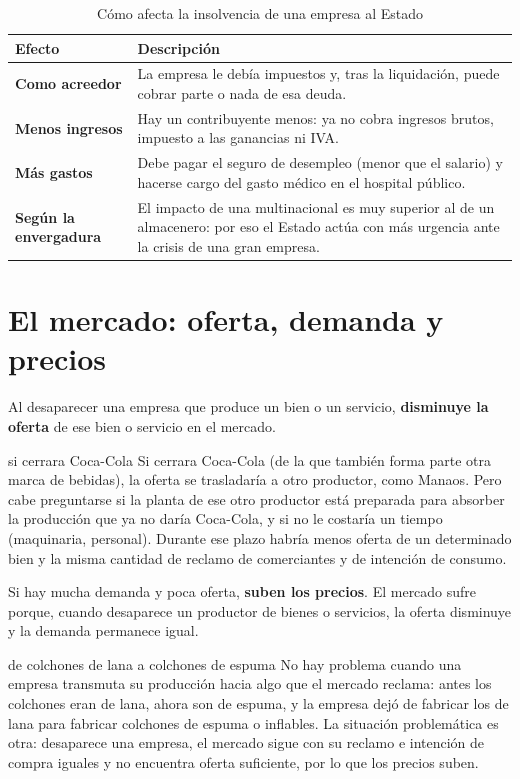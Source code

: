 \documentclass[12pt,oneside]{book}
\begin{document}
\begin{table}[H]
\centering
\caption{Cómo afecta la insolvencia de una empresa al Estado}
\begin{tabularx}{\textwidth}{>{\raggedright\arraybackslash}p{} >{\raggedright\arraybackslash}X}
\toprule
\textbf{Efecto} & \textbf{Descripción} \\
\midrule
\textbf{Como acreedor} & La empresa le debía impuestos y, tras la liquidación, puede cobrar parte o nada de esa deuda. \\
\textbf{Menos ingresos} & Hay un contribuyente menos: ya no cobra ingresos brutos, impuesto a las ganancias ni IVA. \\
\textbf{Más gastos} & Debe pagar el seguro de desempleo (menor que el salario) y hacerse cargo del gasto médico en el hospital público. \\
\textbf{Según la envergadura} & El impacto de una multinacional es muy superior al de un almacenero: por eso el Estado actúa con más urgencia ante la crisis de una gran empresa. \\
\bottomrule
\end{tabularx}
\end{table}

\section{El mercado: oferta, demanda y precios}

Al desaparecer una empresa que produce un bien o un servicio, \textbf{disminuye la oferta} de ese bien o servicio en el mercado.

\begin{example}{si cerrara Coca-Cola}
Si cerrara Coca-Cola (de la que también forma parte otra marca de bebidas), la oferta se trasladaría a otro productor, como Manaos. Pero cabe preguntarse si la planta de ese otro productor está preparada para absorber la producción que ya no daría Coca-Cola, y si no le costaría un tiempo (maquinaria, personal). Durante ese plazo habría menos oferta de un determinado bien y la misma cantidad de reclamo de comerciantes y de intención de consumo.
\end{example}

Si hay mucha demanda y poca oferta, \textbf{suben los precios}. El mercado sufre porque, cuando desaparece un productor de bienes o servicios, la oferta disminuye y la demanda permanece igual.

\begin{example}{de colchones de lana a colchones de espuma}
No hay problema cuando una empresa transmuta su producción hacia algo que el mercado reclama: antes los colchones eran de lana, ahora son de espuma, y la empresa dejó de fabricar los de lana para fabricar colchones de espuma o inflables. La situación problemática es otra: desaparece una empresa, el mercado sigue con su reclamo e intención de compra iguales y no encuentra oferta suficiente, por lo que los precios suben.
\end{example}
\end{document}
